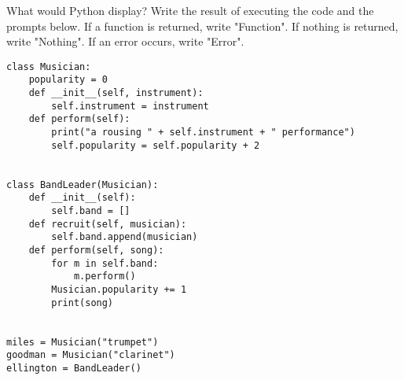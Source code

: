 \begin{blocksection}
\question What would Python display? Write the result of executing the code and the prompts below. If a function is returned, write "Function". If nothing is returned, write "Nothing". If an error occurs, write "Error".

\vspace{2\baselineskip}

\begin{lstlisting}
class Musician:
    popularity = 0
    def __init__(self, instrument):
        self.instrument = instrument
    def perform(self):
        print("a rousing " + self.instrument + " performance")
        self.popularity = self.popularity + 2


class BandLeader(Musician):
    def __init__(self):
        self.band = []
    def recruit(self, musician):
        self.band.append(musician)
    def perform(self, song):
        for m in self.band:
            m.perform()
        Musician.popularity += 1
        print(song)


miles = Musician("trumpet")
goodman = Musician("clarinet")
ellington = BandLeader()
\end{lstlisting}
\end{blocksection}

\newpage

